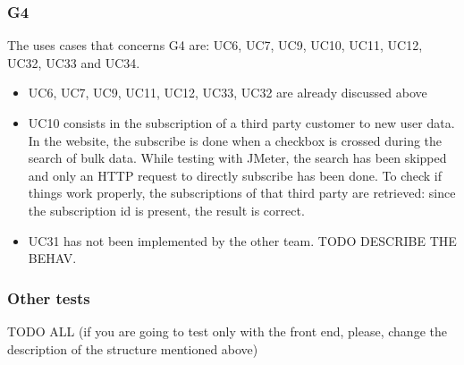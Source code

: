 \subsubsection{G4}
The uses cases that concerns G4 are: UC6, UC7, UC9, UC10, UC11, UC12, UC32, UC33 and UC34. \\

\begin{itemize}
\item 
UC6, UC7, UC9, UC11, UC12, UC33, UC32 are already discussed above

\item 
UC10 consists in the subscription of a third party customer to new user data. \\
In the website, the subscribe is done when a checkbox is crossed during the search of bulk data. 
While testing with JMeter, the search has been skipped and only an HTTP request to directly subscribe has been done.
To check if things work properly, the subscriptions of that third party are retrieved: since the subscription id is present, the
result is correct.

\item UC31 has not been implemented by the other team. TODO DESCRIBE THE BEHAV.

\end{itemize}

\subsubsection{Other tests}
TODO ALL (if you are going to test only with the front end, please, change the description of the structure mentioned above) 